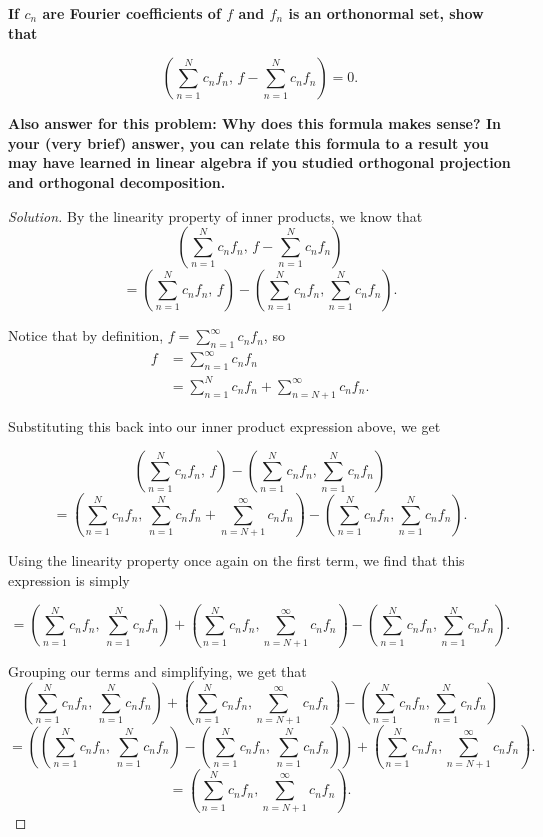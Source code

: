 \documentclass[11pt]{article}
\newenvironment{solution}
  {\renewcommand\qedsymbol{$\blacksquare$}\begin{proof}[Solution]}
  {\end{proof}}
\begin{document}
\textbf{If $c_n$ are Fourier coefficients of $f$ and $f_n$ is an orthonormal set, show that}

\[ \left(\sum\limits_{n=1}^N c_n f_n, \, f  - \sum\limits_{n=1}^N c_nf_n \right) = 0.\]

\textbf{Also answer for this problem: Why does this formula makes sense?
In your (very brief) answer, you can relate this formula to a result you may have learned
in linear algebra if you studied orthogonal projection and orthogonal decomposition.}

\begin{solution}
By the linearity property of inner products, we know that 
\[ \left(\sum\limits_{n=1}^N c_n f_n, \, f  - \sum\limits_{n=1}^N c_nf_n \right)\]
\[ =\left(\sum\limits_{n=1}^N c_n f_n, \, f\right) - \left( \sum\limits_{n=1}^N c_n f_n,\sum\limits_{n=1}^N c_nf_n \right).\]

Notice that by definition, $f = \sum\limits_{n=1}^{\infty} c_nf_n$, so \begin{align*} f &= \sum\limits_{n=1}^{\infty} c_nf_n \\
&= \sum\limits_{n=1}^{N} c_nf_n + \sum\limits_{n=N+1}^{\infty} c_nf_n. \end{align*}

Substituting this back into our inner product expression above, we get

\[ \left(\sum\limits_{n=1}^N c_n f_n, \, f\right) - \left( \sum\limits_{n=1}^N c_n f_n,\sum\limits_{n=1}^N c_nf_n \right) \]
\[ = \left(\sum\limits_{n=1}^N c_n f_n, \, \sum\limits_{n=1}^{N} c_nf_n + \sum\limits_{n=N+1}^{\infty} c_nf_n\right) - \left( \sum\limits_{n=1}^N c_n f_n,\sum\limits_{n=1}^N c_nf_n \right). \]

Using the linearity property once again on the first term, we find that this expression is simply

\[ = \left(\sum\limits_{n=1}^N c_n f_n, \, \sum\limits_{n=1}^{N} c_nf_n\right)  +\left( \sum\limits_{n=1}^N c_nf_n , \sum\limits_{n=N+1}^{\infty} c_nf_n\right) - \left( \sum\limits_{n=1}^N c_n f_n,\sum\limits_{n=1}^N c_nf_n \right). \]

Grouping our terms and simplifying, we get that
\[ \left(\sum\limits_{n=1}^N c_n f_n, \, \sum\limits_{n=1}^{N} c_nf_n\right)  +\left( \sum\limits_{n=1}^N c_nf_n , \sum\limits_{n=N+1}^{\infty} c_nf_n\right) - \left( \sum\limits_{n=1}^N c_n f_n,\sum\limits_{n=1}^N c_nf_n \right)\]
\[ = \left(\left(\sum\limits_{n=1}^N c_n f_n, \, \sum\limits_{n=1}^{N} c_nf_n\right) - \left(\sum\limits_{n=1}^N c_n f_n, \, \sum\limits_{n=1}^{N} c_nf_n\right)\right) + \left( \sum\limits_{n=1}^N c_nf_n , \sum\limits_{n=N+1}^{\infty} c_nf_n\right).\]
\[ = \left( \sum\limits_{n=1}^N c_nf_n , \sum\limits_{n=N+1}^{\infty} c_nf_n\right).\]


\end{solution}
\end{document}
